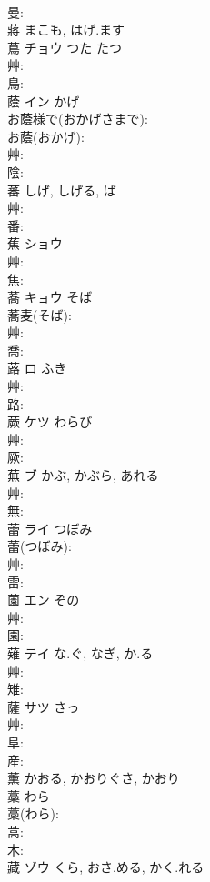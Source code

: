 \documentclass[8pt]{extreport}
\begin{document}
\begin{CJK}{UTF8}{min}
\\	曼: 
\\	蔣		まこも, はげ.ます				
\\	蔦	チョウ	つた	たつ	
\\	艸: 
\\	鳥: 
\\	蔭	イン	かげ		
\\	お蔭様で(おかげさまで): 
\\	お蔭(おかげ): 
\\	艸: 
\\	陰: 
\\	蕃			しげ, しげる, ば		
\\	艸: 
\\	番: 
\\	蕉	ショウ			
\\	艸: 
\\	焦: 
\\	蕎	キョウ	そば		
\\	蕎麦(そば): 
\\	艸: 
\\	喬: 
\\	蕗	ロ	ふき		
\\	艸: 
\\	路: 
\\	蕨	ケツ	わらび		
\\	艸: 
\\	厥: 
\\	蕪	ブ	かぶ, かぶら, あれる		
\\	艸: 
\\	無: 
\\	蕾	ライ	つぼみ		
\\	蕾(つぼみ): 
\\	艸: 
\\	雷: 
\\	薗	エン		ぞの	
\\	艸: 
\\	園: 
\\	薙	テイ	な.ぐ, なぎ, か.る		
\\	艸: 
\\	雉: 
\\	薩	サツ		さっ	
\\	艸: 
\\	阜: 
\\	産: 
\\	薰		かおる, かおりぐさ, かおり				
\\	藁		わら			
\\	藁(わら): 
\\	蒿: 
\\	木: 
\\	藏	ゾウ	くら, おさ.める, かく.れる		

\end{CJK}
\end{document}
